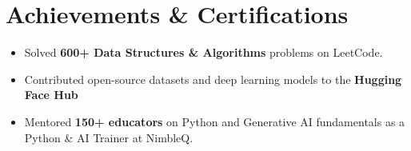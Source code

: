\documentclass[a4paper,10pt]{article}
\begin{document}
\section*{Achievements \& Certifications}
\begin{itemize}
    \item Solved \textbf{600+ Data Structures \& Algorithms} problems on LeetCode.
    \item Contributed open-source datasets and deep learning models to the \textbf{Hugging Face Hub}
    \item Mentored \textbf{150+ educators} on Python and Generative AI fundamentals as a Python \& AI Trainer at NimbleQ.

\end{itemize}
\end{document}
